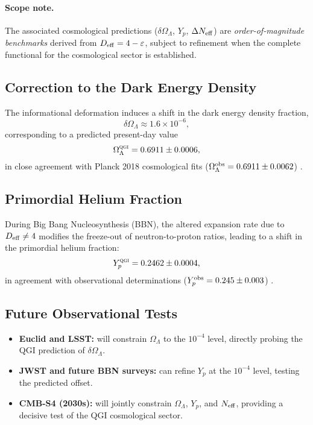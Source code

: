 \documentclass{article}
\numberwithin{equation}{section}
\theoremstyle{plain}
\theoremstyle{definition}
\theoremstyle{remark}
\newcommand{\qgi}{\textsc{qgi}}
\begin{document}
\paragraph{Scope note.}
The associated cosmological predictions ($\delta\Omega_\Lambda$, $Y_p$, $\Delta N_{\rm eff}$) are \emph{order-of-magnitude benchmarks} derived from $D_{\rm eff}=4-\varepsilon$, subject to refinement when the complete functional for the cosmological sector is established.

\subsection{Correction to the Dark Energy Density}
The informational deformation induces a shift in the dark energy density fraction,
\begin{equation}
\delta \Omega_\Lambda \approx 1.6 \times 10^{-6},
\end{equation}
corresponding to a predicted present-day value
\begin{equation}
\Omega_\Lambda^{\qgi} = 0.6911 \pm 0.0006,
\end{equation}
in close agreement with Planck 2018 cosmological fits ($\Omega_\Lambda^{\rm obs} = 0.6911 \pm 0.0062$) \cite{Planck2018}.

\subsection{Primordial Helium Fraction}
During Big Bang Nucleosynthesis (BBN), the altered expansion rate due to $D_{\rm eff}\neq 4$ modifies the freeze-out of neutron-to-proton ratios, leading to a shift in the primordial helium fraction:
\begin{equation}
Y_p^{\qgi} = 0.2462 \pm 0.0004,
\end{equation}
in agreement with observational determinations ($Y_p^{\rm obs} = 0.245 \pm 0.003$) \cite{Cooke2018}.

\subsection{Future Observational Tests}
\begin{itemize}
    \item \textbf{Euclid and LSST:} will constrain $\Omega_\Lambda$ to the $10^{-4}$ level, directly probing the QGI prediction of $\delta \Omega_\Lambda$.
    \item \textbf{JWST and future BBN surveys:} can refine $Y_p$ at the $10^{-4}$ level, testing the predicted offset.
    \item \textbf{CMB-S4 (2030s):} will jointly constrain $\Omega_\Lambda$, $Y_p$, and $N_{\rm eff}$, providing a decisive test of the QGI cosmological sector.
\end{itemize}
\end{document}
